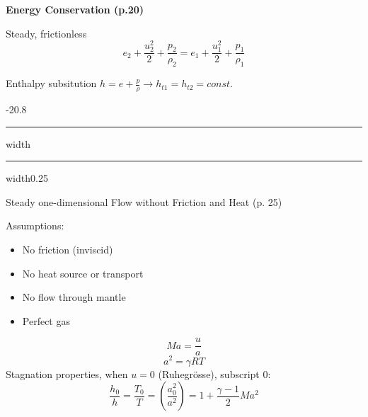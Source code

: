\documentclass[8pt, landscape, fleqn]{scrartcl}
\makeatletter
\renewcommand{\section}{\@startsection{section}{1}{0mm}%
{-2\baselineskip}{0.8\baselineskip}%
{\hrule depth 0.2pt width\columnwidth\hrule depth1.5pt
width0.25\columnwidth\vspace*{1.2em}\Large\bfseries\rmfamily}}
\makeatother
\begin{document}
\begin{multicols*}{3}
\textbf{Energy Conservation (p.20)}

Steady, frictionless
\begin{equation*}
    e_2 + \frac{u_2^2}{2} + \frac{p_2}{\rho_2} = e_1 + \frac{u_1^2}{2} + \frac{p_1}{\rho_1}
\end{equation*}

Enthalpy subsitution $h = e + \frac{p}{\rho} \rightarrow h_{t1} = h_{t2} = const.$

\section{Steady one-dimensional Flow without Friction and Heat (p. 25)}

Assumptions: 

\begin{itemize}
    \item No friction (inviscid)
    \item No heat source or transport
    \item No flow through mantle
    \item Perfect gas
\end{itemize}
\begin{equation*}
    Ma = \frac{u}{a}
\end{equation*}
\begin{equation*}
    a^2 = \gamma R T 
\end{equation*}
Stagnation properties, when $u=0$ (Ruhegrösse), subscript 0: 
\begin{equation*}
    \frac{h_0}{h} = \frac{T_0}{T} = \left( \frac{a_0^2}{a^2}\right) = 1 + \frac{\gamma - 1}{2} Ma^2
\end{equation*}


\end{multicols*}
\end{document}
